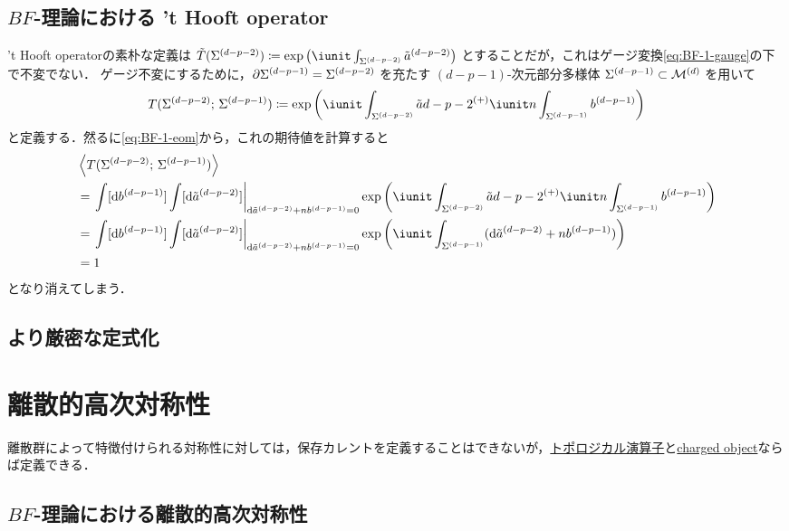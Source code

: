 \documentclass[TQFT_main]{subfiles}
\begin{document}
\subsection{$BF$-理論における 't Hooft operator}

't Hooft operatorの素朴な定義は $\tilde{T}(\mfd{\Sigma}{d-p-2}) \coloneqq \exp \left( \iunit \int_{\mfd{\Sigma}{d-p-2}} \hg{\tilde{a}}{d-p-2}\right)$ とすることだが，これはゲージ変換\eqref{eq:BF-1-gauge}の下で不変でない．
ゲージ不変にするために，$\partial \Sigma^{(d-p-1)} = \Sigma^{(d-p-2)}$ を充たす $(d-p-1)$-次元部分多様体 $\Sigma^{(d-p-1)} \subset \mathcal{M}^{(d)}$ を用いて
\begin{align}
    \label{eq:BF-1-tHooft}
    T (\mfd{\Sigma}{d-p-2};\, \mfd{\Sigma}{d-p-1}) \coloneqq \exp \left( \iunit \int_{\mfd{\Sigma}{d-p-2}} \hg{\tilde{a}{d-p-2}} + \iunit n \int_{\mfd{\Sigma}{d-p-1}} \hg{b}{d-p-1}\right) 
\end{align}
と定義する．然るに\eqref{eq:BF-1-eom}から，これの期待値を計算すると
\begin{align}
    &\expval{T (\mfd{\Sigma}{d-p-2};\, \mfd{\Sigma}{d-p-1})} \\
    &= \eval{\int [\dd{\hg{b}{d-p-1}}] \int [\dd{\hg{\tilde{a}}{d-p-2}}]}_{\dd{\hg{\tilde{a}}{d-p-2}} + n \hg{b}{d-p-1} = 0} \exp \left( \iunit \int_{\mfd{\Sigma}{d-p-2}} \hg{\tilde{a}{d-p-2}} + \iunit n \int_{\mfd{\Sigma}{d-p-1}} \hg{b}{d-p-1}\right) \\
    &= \eval{\int [\dd{\hg{b}{d-p-1}}] \int [\dd{\hg{\tilde{a}}{d-p-2}}]}_{\dd{\hg{\tilde{a}}{d-p-2}} + n \hg{b}{d-p-1} = 0} \exp \left( \iunit \int_{\mfd{\Sigma}{d-p-1}} ( \dd{\hg{\tilde{a}}{d-p-2}} + n\hg{b}{d-p-1} )\right) \\
    &= 1
\end{align}
となり消えてしまう．

\subsection{より厳密な定式化}

\section{離散的高次対称性}

離散群によって特徴付けられる対称性に対しては，保存カレントを定義することはできないが，\hyperref[def:p-form-sym]{トポロジカル演算子}と\hyperref[def:p-form-sym]{charged object}ならば定義できる．

\subsection{$BF$-理論における離散的高次対称性}
\end{document}
